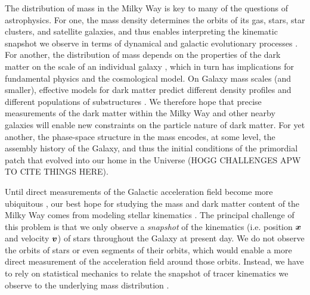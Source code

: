 
The distribution of mass in the Milky Way is key to
many of the questions of astrophysics.
For one, the mass density determines the orbits of its gas, stars, star
clusters, and satellite galaxies, and thus enables interpreting the kinematic snapshot
we observe in terms of dynamical and galactic evolutionary processes
\citep[e.g.,][]{Freeman:2002,Helmi:2020}.
For another, the distribution of mass depends on the
properties of the dark matter on the scale of an individual galaxy
\citep[e.g.,][]{Bertone:2005, Buckley:2018}, which in turn has implications for fundamental physics and the cosmological model.
On Galaxy mass scales (and smaller), effective models for dark matter predict different
density profiles and different populations of substructures
\citep[e.g.,][]{Bullock:2017}.
We therefore hope that precise measurements of the dark matter within the
Milky Way and other nearby galaxies will enable new constraints on the particle nature
of dark matter.
For yet another, the phase-space structure in the mass encodes, at some level, the assembly history of the Galaxy, and thus the initial conditions of the primordial patch that evolved into our home in the Universe (HOGG CHALLENGES APW TO CITE THINGS HERE).

Until direct measurements of the Galactic acceleration field become more ubiquitous
\citep{Klioner:2021, Chakrabarti:2021}, our best hope for studying the mass and dark
matter content of the Milky Way comes from modeling stellar kinematics
\citep[e.g.,][]{Oort:1932, Binney:2008, Rix:2013}.
The principal challenge of this problem is that we only observe a \emph{snapshot} of the
kinematics (i.e. position $\boldsymbol{x}$ and velocity $\boldsymbol{v}$) of stars throughout the Galaxy
at present day.
We do not observe the orbits of stars or even segments of their orbits, which would
enable a more direct measurement of the acceleration field around those orbits.
Instead, we have to rely on statistical mechanics to relate the snapshot of tracer
kinematics we observe to the underlying mass distribution \citep[e.g.,][]{Kuijken:1989a,
Binney:2008, Magorrian:2014}.


